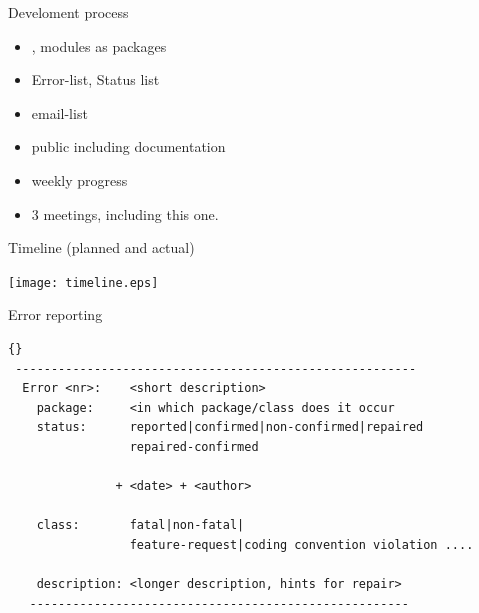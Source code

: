 \begin{myslide}{Develoment process}
  \begin{itemize}
  \item {}, modules as packages
  \item Error-list, Status list
  \item email-list
  \item public  including \javadoc{} documentation
  \item weekly progress 
  \item 3  meetings, including this one.
  \end{itemize}
\end{myslide}


\begin{myslide}{Timeline (planned and actual)}
  \begin{center}
   \texttt{[image: timeline.eps]}  
    \end{center}
\end{myslide}



\begin{myslide}{Error reporting}
  \begin{lstlisting}{}
 --------------------------------------------------------
  Error <nr>:    <short description>
    package:     <in which package/class does it occur
    status:      reported|confirmed|non-confirmed|repaired
                 repaired-confirmed

               + <date> + <author>
   
    class:       fatal|non-fatal|
                 feature-request|coding convention violation ....

    description: <longer description, hints for repair>
   -----------------------------------------------------
  \end{lstlisting}
\end{myslide}



